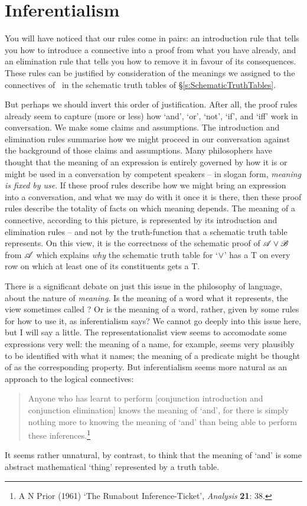 \section{Inferentialism}\label{inferentialism}

You will have noticed that our rules come in pairs: an introduction rule that tells you how to introduce a connective into a proof from what you have already, and an elimination rule that tells you how to remove it in favour of its consequences. These rules can be justified by consideration of the meanings we assigned to the connectives of \TFL\ in the schematic truth tables of §\ref{s:SchematicTruthTables}.

But perhaps we should invert this order of justification. After all, the proof rules already seem to capture (more or less) how `and', `or', `not', `if', and `iff' work in conversation. We make some claims and assumptions. The introduction and elimination rules summarise how we might proceed in our conversation against the background of those claims and assumptions. Many philosophers have thought that the meaning of an expression is entirely governed by how it is or might be used in a conversation by competent speakers – in slogan form, \emph{meaning is fixed by use}. If these proof rules describe how we might bring an expression into a conversation, and what we may do with it once it is there, then these proof rules describe the totality of facts on which meaning depends. The meaning of a connective, according to this  picture, is represented by its introduction and elimination rules – and not by the truth-function that a schematic truth table represents. On this view, it is the correctness of the schematic proof of $\mathscr{A}\vee\mathscr{B}$ from $\mathscr{A}$ which explains \emph{why} the schematic truth table for `$\vee$' has a T on every row on which at least one of its constituents gets a T. 

There is a significant debate on just this issue in the philosophy of language, about the nature of \emph{meaning}. Is the meaning of a word what it represents, the view sometimes called ? Or is the meaning of a word, rather, given by some rules for how to use it, as inferentialism says? We cannot go deeply into this issue here, but I will say a little. The representationalist view seems to accomodate some expressions very well: the meaning of a name, for example, seems very plausibly to be identified with what it names; the meaning of a predicate might be thought of as the corresponding property. But inferentialism seems more natural as an approach to the logical connectives: 
\begin{quote}
	Anyone who has learnt to perform [conjunction introduction and conjunction elimination] knows the meaning of ‘and’, for there is simply nothing more to knowing the meaning of ‘and’ than being able to perform these inferences.\footnote{A N Prior (1961) `The Runabout Inference-Ticket', \emph{Analysis} \textbf{21}: 38.}
\end{quote} It seems rather unnatural, by contrast, to think that the meaning of `and' is some abstract mathematical `thing' represented by a truth table.


